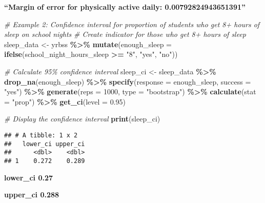 \documentclass[
]{article}
\newenvironment{Shaded}{\begin{snugshade}}{\end{snugshade}}
\newcommand{\AttributeTok}[1]{\textcolor[rgb]{0.13,0.29,0.53}{#1}}
\newcommand{\CommentTok}[1]{\textcolor[rgb]{0.56,0.35,0.01}{\textit{#1}}}
\newcommand{\DecValTok}[1]{\textcolor[rgb]{0.00,0.00,0.81}{#1}}
\newcommand{\FloatTok}[1]{\textcolor[rgb]{0.00,0.00,0.81}{#1}}
\newcommand{\FunctionTok}[1]{\textcolor[rgb]{0.13,0.29,0.53}{\textbf{#1}}}
\newcommand{\NormalTok}[1]{#1}
\newcommand{\OtherTok}[1]{\textcolor[rgb]{0.56,0.35,0.01}{#1}}
\newcommand{\SpecialCharTok}[1]{\textcolor[rgb]{0.81,0.36,0.00}{\textbf{#1}}}
\newcommand{\StringTok}[1]{\textcolor[rgb]{0.31,0.60,0.02}{#1}}
\begin{document}
\textbf{``Margin of error for physically active daily:
0.00792824943651391''}

\begin{Shaded}
\begin{Highlighting}[]
\CommentTok{\# Example 2: Confidence interval for proportion of students who get 8+ hours of sleep on school nights}
\CommentTok{\# Create indicator for those who get 8+ hours of sleep}
\NormalTok{sleep\_data }\OtherTok{\textless{}{-}}\NormalTok{ yrbss }\SpecialCharTok{\%\textgreater{}\%}
  \FunctionTok{mutate}\NormalTok{(}\AttributeTok{enough\_sleep =} \FunctionTok{ifelse}\NormalTok{(school\_night\_hours\_sleep }\SpecialCharTok{\textgreater{}=} \StringTok{"8"}\NormalTok{, }\StringTok{"yes"}\NormalTok{, }\StringTok{"no"}\NormalTok{))}
\end{Highlighting}
\end{Shaded}

\begin{Shaded}
\begin{Highlighting}[]
\CommentTok{\# Calculate 95\% confidence interval}
\NormalTok{sleep\_ci }\OtherTok{\textless{}{-}}\NormalTok{ sleep\_data }\SpecialCharTok{\%\textgreater{}\%}
  \FunctionTok{drop\_na}\NormalTok{(enough\_sleep) }\SpecialCharTok{\%\textgreater{}\%}
  \FunctionTok{specify}\NormalTok{(}\AttributeTok{response =}\NormalTok{ enough\_sleep, }\AttributeTok{success =} \StringTok{"yes"}\NormalTok{) }\SpecialCharTok{\%\textgreater{}\%}
  \FunctionTok{generate}\NormalTok{(}\AttributeTok{reps =} \DecValTok{1000}\NormalTok{, }\AttributeTok{type =} \StringTok{"bootstrap"}\NormalTok{) }\SpecialCharTok{\%\textgreater{}\%}
  \FunctionTok{calculate}\NormalTok{(}\AttributeTok{stat =} \StringTok{"prop"}\NormalTok{) }\SpecialCharTok{\%\textgreater{}\%}
  \FunctionTok{get\_ci}\NormalTok{(}\AttributeTok{level =} \FloatTok{0.95}\NormalTok{)}

\CommentTok{\# Display the confidence interval}
\FunctionTok{print}\NormalTok{(sleep\_ci)}
\end{Highlighting}
\end{Shaded}

\begin{verbatim}
## # A tibble: 1 x 2
##   lower_ci upper_ci
##      <dbl>    <dbl>
## 1    0.272    0.289
\end{verbatim}

\textbf{lower\_ci 0.27}

\textbf{upper\_ci 0.288}

\begin{Shaded}
\end{Shaded}
\end{document}
